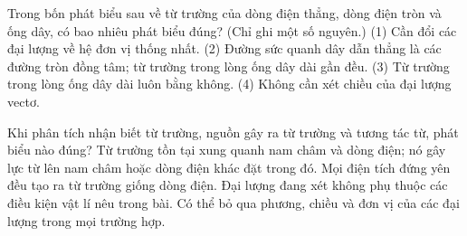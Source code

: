 \begin{ex}
Trong bốn phát biểu sau về từ trường của dòng điện thẳng, dòng điện tròn và ống dây, có bao nhiêu phát biểu đúng? (Chỉ ghi một số nguyên.) (1) Cần đổi các đại lượng về hệ đơn vị thống nhất. (2) Đường sức quanh dây dẫn thẳng là các đường tròn đồng tâm; từ trường trong lòng ống dây dài gần đều. (3) Từ trường trong lòng ống dây dài luôn bằng không. (4) Không cần xét chiều của đại lượng vectơ.
\end{ex}

\begin{ex}
Khi phân tích nhận biết từ trường, nguồn gây ra từ trường và tương tác từ, phát biểu nào đúng?
\choice
{\True Từ trường tồn tại xung quanh nam châm và dòng điện; nó gây lực từ lên nam châm hoặc dòng điện khác đặt trong đó.}
{Mọi điện tích đứng yên đều tạo ra từ trường giống dòng điện.}
{Đại lượng đang xét không phụ thuộc các điều kiện vật lí nêu trong bài.}
{Có thể bỏ qua phương, chiều và đơn vị của các đại lượng trong mọi trường hợp.}
\end{ex}


